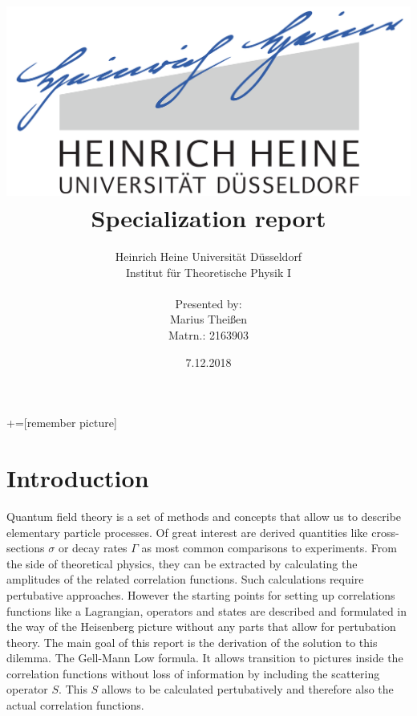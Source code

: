\documentclass[12pt, titlepage]{article}
\title{\includegraphics[scale=0.07]{logo}\\Specialization report}
\date{7.12.2018}
\author{ Heinrich Heine Universit\"at D\"usseldorf\\ Institut f\"ur Theoretische Physik I\\  \\Presented by:\\Marius Thei\ss{}en\\ Matrn.: 2163903 \\  }
\begin{document}
+=[remember picture]
\everymath{\displaystyle}

\maketitle %
\tableofcontents
\newpage
\section{Introduction}\label{Introduction}
Quantum field theory is a set of methods and concepts that allow us to describe elementary particle processes. Of great interest are derived quantities like cross-sections $ \sigma  $ or decay rates $ \Gamma $ as most common comparisons to experiments. From the side of theoretical physics, they can be extracted by calculating the amplitudes of the related correlation functions. Such calculations require pertubative approaches. However the starting points for setting up correlations functions like a Lagrangian, operators and states are described and formulated in the way of the Heisenberg picture without any parts that allow for pertubation theory. The main goal of this report is the derivation of the solution to this dilemma. The Gell-Mann Low formula. It allows transition to pictures inside the correlation functions without loss of information by including the scattering operator $ S $. This $ S $ allows to be calculated pertubatively and therefore also the actual correlation functions.  
\end{document}
